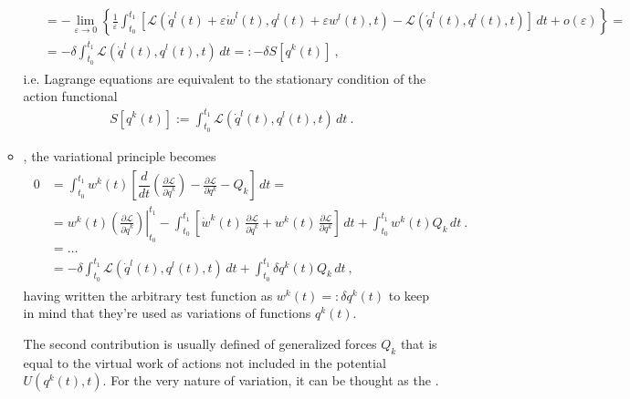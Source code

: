 \documentclass[letterpaper,10pt,english]{jupyterBook}
\begin{document}
\begin{itemize}
\begin{itemize}
\begin{equation*}
\begin{split}
\begin{aligned}
           & = - \lim_{\varepsilon \rightarrow 0} \left\{ \frac{1}{\varepsilon} \int_{t_0}^{t_1} \left[ \mathscr{L}\left(\dot{q}^l(t)+\varepsilon \dot{w}^l(t), q^l(t) + \varepsilon w^l(t), t \right) - \mathscr{L}\left(\dot{q}^l(t), q^l(t), t \right) \right] \, dt + o(\varepsilon) \right\}= \\
           & = - \delta \int_{t_0}^{t_1} \mathscr{L}(\dot{q}^l(t), q^l(t), t) \, dt =: - \delta S[q^k(t)] \ ,
       \end{aligned}\end{split}
\end{equation*}
\sphinxAtStartPar
i.e. Lagrange equations are equivalent to the stationary condition of the action functional
\begin{equation*}
\begin{split}S[q^k(t)]:= \int_{t_0}^{t_1} \mathscr{L}\left(\dot{q}^l(t), q^l(t), t\right) \, dt \ .\end{split}
\end{equation*}
\item {} 
\sphinxAtStartPar
{}, the variational principle becomes
\begin{equation*}
\begin{split}\begin{aligned}
           0 & = \int_{t_0}^{t_1} w^k (t) \left[ \dfrac{d}{dt}\left( \frac{\partial \mathscr{L}}{\partial \dot{q}^k} \right) - \frac{\partial \mathscr{L}}{\partial q^k} - Q_k \right] \, dt = \\
             & = w^k(t) \left.\left( \frac{\partial \mathscr{L}}{\partial \dot{q}^k} \right)\right|_{t_0}^{t_1} - \int_{t_0}^{t_1} \left[ \dot{w}^k(t) \, \frac{\partial \mathscr{L}}{\partial \dot{q}^k} + w^k(t) \, \frac{\partial \mathscr{L}}{\partial q^k} \right] \, dt 
             + \int_{t_0}^{t_1} w^k(t) Q_k \, dt \ . \\
             & = \dots \\
             & = - \delta \int_{t_0}^{t_1} \mathscr{L}\left(\dot{q}^l(t), q^l(t), t\right) \, dt + \int_{t_0}^{t_1} \delta q^k(t) Q_k \, dt \ ,
       \end{aligned}\end{split}
\end{equation*}
\sphinxAtStartPar
having written the arbitrary test function as \(w^k(t) =: \delta q^k(t)\) to keep in mind that they’re used as variations of functions \(q^k(t)\).

\sphinxAtStartPar
The second contribution is usually defined  of generalized forces \(Q_k\) \sphinxhyphen{} that is equal to the virtual work of actions not included in the potential \(U\left(q^k(t),t\right)\). For the very nature of variation, it can be thought as the .

\end{itemize}

\end{itemize}
\end{document}
